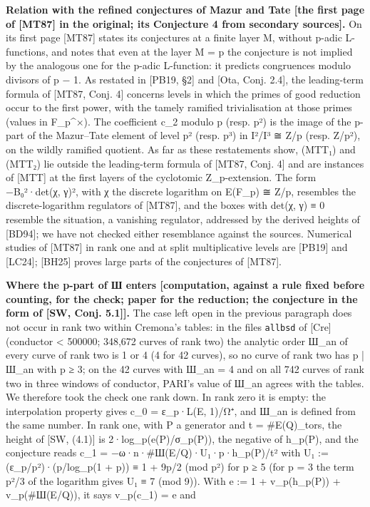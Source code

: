 \documentclass[11pt,a4paper]{article}
\theoremstyle{named}
\begin{document}
\textbf{Relation with the refined conjectures of Mazur and Tate [the first page of [MT87] in the original; its Conjecture 4 from secondary sources].} On its first page [MT87] states its conjectures at a finite layer M, without p-adic L-functions, and notes that even at the layer M = p the conjecture is not implied by the analogous one for the p-adic L-function: it predicts congruences modulo divisors of p − 1. As restated in [PB19, §2] and [Ota, Conj. 2.4], the leading-term formula of [MT87, Conj. 4] concerns levels in which the primes of good reduction occur to the first power, with the tamely ramified trivialisation at those primes (values in F\_p\textasciicircum{}×). The coefficient c\_2 modulo p (resp. p²) is the image of the p-part of the Mazur–Tate element of level p² (resp. p³) in I²/I³ ≅ Z/p (resp. Z/p²), on the wildly ramified quotient. As far as these restatements show, (MTT₁) and (MTT₂) lie outside the leading-term formula of [MT87, Conj. 4] and are instances of [MTT] at the first layers of the cyclotomic Z\_p-extension. The form −B₀²·det(χ, γ)², with χ the discrete logarithm on E(F\_p) ≅ Z/p, resembles the discrete-logarithm regulators of [MT87], and the boxes with det(χ, γ) ≡ 0 resemble the situation, a vanishing regulator, addressed by the derived heights of [BD94]; we have not checked either resemblance against the sources. Numerical studies of [MT87] in rank one and at split multiplicative levels are [PB19] and [LC24]; [BH25] proves large parts of the conjectures of [MT87].

\textbf{Where the p-part of Ш enters [computation, against a rule fixed before counting, for the check; paper for the reduction; the conjecture in the form of [SW, Conj. 5.1]].} The case left open in the previous paragraph does not occur in rank two within Cremona's tables: in the files \texttt{allbsd} of [Cre] (conductor \textless{} 500000; 348,672 curves of rank two) the analytic order Ш\_an of every curve of rank two is 1 or 4 (4 for 42 curves), so no curve of rank two has p | Ш\_an with p ≥ 3; on the 42 curves with Ш\_an = 4 and on all 742 curves of rank two in three windows of conductor, PARI's value of Ш\_an agrees with the tables. We therefore took the check one rank down. In rank zero it is empty: the interpolation property gives c\_0 = ε\_p·L(E, 1)/Ω⁺, and Ш\_an is defined from the same number. In rank one, with P a generator and t = \#E(Q)\_tors, the height of [SW, (4.1)] is 2·log\_p(e(P)/σ\_p(P)), the negative of h\_p(P), and the conjecture reads c\_1 = −ω·n·\#Ш(E/Q)·U₁·p·h\_p(P)/t² with U₁ := (ε\_p/p²)·(p/log\_p(1 + p)) ≡ 1 + 9p/2 (mod p²) for p ≥ 5 (for p = 3 the term p²/3 of the logarithm gives U₁ ≡ 7 (mod 9)). With e := 1 + v\_p(h\_p(P)) + v\_p(\#Ш(E/Q)), it says v\_p(c\_1) = e and
\end{document}
